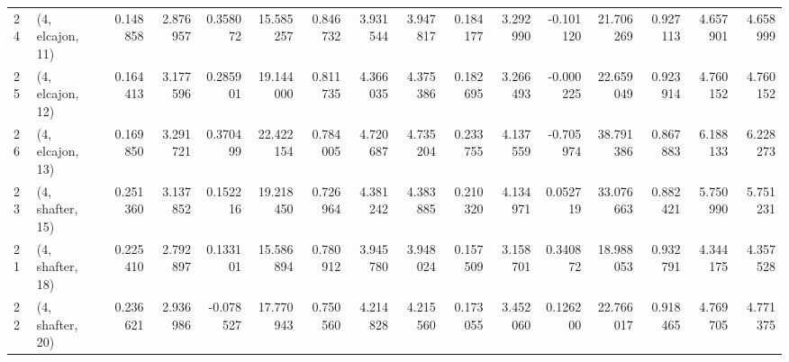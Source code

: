 \begin{tabular}{llrrrrrrrrrrrrrr}
24 &  (4, elcajon, 11) &   0.148858 &  2.876957 &  0.358072 &  15.585257 &  0.846732 &   3.931544 &  3.947817 &  0.184177 &   3.292990 & -0.101120 &   21.706269 &  0.927113 &   4.657901 &   4.658999 \\
25 &  (4, elcajon, 12) &   0.164413 &  3.177596 &  0.285901 &  19.144000 &  0.811735 &   4.366035 &  4.375386 &  0.182695 &   3.266493 & -0.000225 &   22.659049 &  0.923914 &   4.760152 &   4.760152 \\
26 &  (4, elcajon, 13) &   0.169850 &  3.291721 &  0.370499 &  22.422154 &  0.784005 &   4.720687 &  4.735204 &  0.233755 &   4.137559 & -0.705974 &   38.791386 &  0.867883 &   6.188133 &   6.228273 \\
23 &  (4, shafter, 15) &   0.251360 &  3.137852 &  0.152216 &  19.218450 &  0.726964 &   4.381242 &  4.383885 &  0.210320 &   4.134971 &  0.052719 &   33.076663 &  0.882421 &   5.750990 &   5.751231 \\
21 &  (4, shafter, 18) &   0.225410 &  2.792897 &  0.133101 &  15.586894 &  0.780912 &   3.945780 &  3.948024 &  0.157509 &   3.158701 &  0.340872 &   18.988053 &  0.932791 &   4.344175 &   4.357528 \\
22 &  (4, shafter, 20) &   0.236621 &  2.936986 & -0.078527 &  17.770943 &  0.750560 &   4.214828 &  4.215560 &  0.173055 &   3.452060 &  0.126200 &   22.766017 &  0.918465 &   4.769705 &   4.771375 \\
\bottomrule
\end{tabular}
